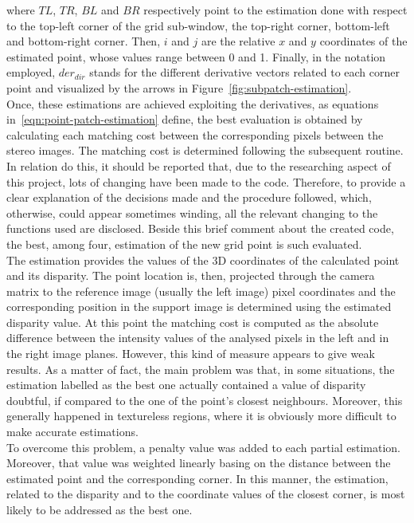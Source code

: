where $TL$, $TR$, $BL$ and $BR$ respectively point to the estimation done with respect to the top-left corner of the grid sub-window, the top-right corner, bottom-left and bottom-right corner. 
Then, $i$ and $j$ are the relative $x$ and $y$ coordinates of the estimated point, whose values range between 0 and 1.
Finally, in the notation employed, $der_{dir}$ stands for the different derivative vectors related to each corner point and visualized by the arrows in Figure~\ref{fig:subpatch-estimation}. \\
Once, these estimations are achieved exploiting the derivatives, as equations in~\ref{eqn:point-patch-estimation} define, the best evaluation is obtained by calculating each matching cost between the corresponding pixels between the stereo images. 
The matching cost is determined following the subsequent routine.\\
In relation do this, it should be reported that, due to the researching aspect of this project, lots of changing have been made to the code.
Therefore, to provide a clear explanation of the decisions made and the procedure followed, which, otherwise, could appear sometimes winding, all the relevant changing to the functions used are disclosed. 
Beside this brief comment about the created code, the best, among four, estimation of the new grid point is such evaluated.\\
The estimation provides the values of the 3D coordinates of the calculated point and its disparity.
The point location is, then, projected through the camera matrix to the reference image (usually the left image) pixel coordinates and the corresponding position in the support image is determined using the estimated disparity value. 
At this point the matching cost is computed as the absolute difference between the intensity values of the analysed pixels in the left and in the right image planes. 
However, this kind of measure appears to give weak results. 
As a matter of fact, the main problem was that, in some situations, the estimation labelled as the best one actually contained a value of disparity doubtful, if compared to the one of the point's closest neighbours.  
Moreover, this generally happened in textureless regions, where it is obviously more difficult to make accurate estimations.\\
To overcome this problem, a penalty value was added to each partial estimation. 
Moreover, that value was weighted linearly basing on the distance between the estimated point and the corresponding corner. 
In this manner, the estimation, related to the disparity and to the coordinate values of the closest corner, is most likely to be addressed as the best one.
